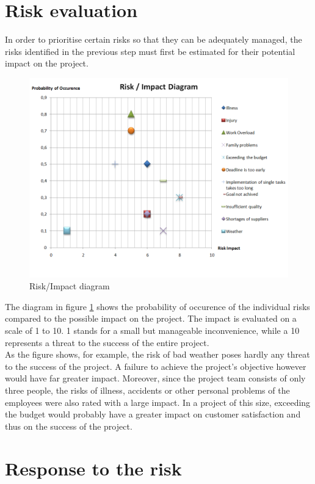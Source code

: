 \section{Risk evaluation}
In order to prioritise certain risks so that they can be adequately managed, the risks identified in the previous step must first be estimated for their potential impact on the project.
	\begin{figure}[H]
	\centering
	\includegraphics[width =1.1\textwidth]{images/risk-impact2.PNG}
	\caption{Risk/Impact diagram}
	\label{risk-impact}
\end{figure}
The diagram in figure \ref{risk-impact} shows the probability of occurence of the individual risks compared to the possible impact on the project. The impact is evaluated on a scale of 1 to 10. 1 stands for a small but manageable inconvenience, while a 10 represents a threat to the success of the entire project.
\\
As the figure shows, for example, the risk of bad weather poses hardly any threat to the success of the project. A failure to achieve the project's objective however would have far greater impact. Moreover, since the project team consists of only three people, the risks of illness, accidents or other personal problems of the employees were also rated with a large impact. In a project of this size, exceeding the budget would probably have a greater impact on customer satisfaction and thus on the success of the project.

\section{Response to the risk}

